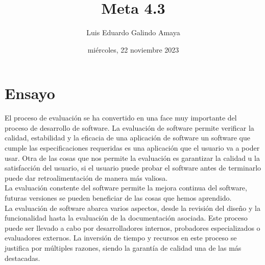 \documentclass[11pt]{article}
\author{Luis Eduardo Galindo Amaya}
\date{miércoles, 22 noviembre 2023}
\title{Meta 4.3}
\begin{document}


\section{Ensayo}
\label{sec:org57f51f4}
El proceso de evaluación se ha convertido en una face muy importante
del proceso de desarrollo de software. La evaluación de software
permite verificar la calidad, estabilidad y la eficacia de una
aplicación de software un software que cumple las especificaciones
requeridas es una aplicación que el usuario va a poder usar. Otra de
las cosas que nos permite la evaluación es garantizar la calidad u la
satisfacción del usuario, si el usuario puede probar el software antes
de terminarlo puede dar retroalimentación de manera más valiosa. \\

La evaluación constente del software permite la mejora continua del
software, futuras versiones se pueden beneficiar de las cosas que
hemos aprendido. \\

La evaluación de software abarca varios aspectos, desde la revisión
del diseño y la funcionalidad hasta la evaluación de la documentación
asociada. Este proceso puede ser llevado a cabo por desarrolladores
internos, probadores especializados o evaluadores externos. La
inversión de tiempo y recursos en este proceso se justifica por
múltiples razones, siendo la garantía de calidad una de las más
destacadas. \\
\end{document}
